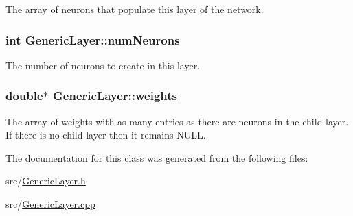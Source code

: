 The array of neurons that populate this layer of the network. \hypertarget{classGenericLayer_7b45631903aa50e67fe5a1947fc292bd}{
\subsubsection{\setlength{\rightskip}{0pt plus 5cm}int {\bf GenericLayer::numNeurons}}}
\label{classGenericLayer_7b45631903aa50e67fe5a1947fc292bd}


The number of neurons to create in this layer. \hypertarget{classGenericLayer_01148a903b47b9329e0378274fe5a492}{
\subsubsection{\setlength{\rightskip}{0pt plus 5cm}double$\ast$ {\bf GenericLayer::weights}}}
\label{classGenericLayer_01148a903b47b9329e0378274fe5a492}


The array of weights with as many entries as there are neurons in the child layer. If there is no child layer then it remains NULL. 

The documentation for this class was generated from the following files:\begin{CompactItemize}
\item 
src/\hyperlink{GenericLayer_8h}{GenericLayer.h}\item 
src/\hyperlink{GenericLayer_8cpp}{GenericLayer.cpp}\end{CompactItemize}
